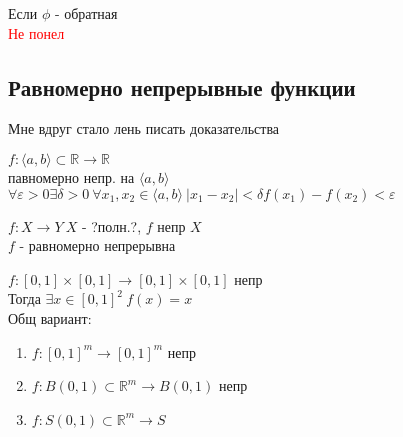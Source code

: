 \documentclass[12pt]{article}
\begin{document}
\begin{note}
  Если $\phi$ - обратная \\
  \textcolor{red}{Не понел} %
\end{note}
\subsection{Равномерно непрерывные функции}
Мне вдруг стало лень писать доказательства %
\begin{definition}
  $f: \langle a, b \rangle \subset \mathbb{R} \rightarrow \mathbb{R}$ \\
  павномерно непр. на $\langle a, b \rangle$ \\
  $\forall \varepsilon > 0 \exists \delta > 0\ \forall x_1, x_2 \in \langle a, b \rangle\ |x_1 - x_2| < \delta f(x_1) - f(x_2) < \varepsilon$
\end{definition}
\begin{theorem}[Кантора]
  $f: X \rightarrow Y\ X$ - ?полн.?, $f$ непр $X$ \\
  $f$ - равномерно непрерывна
\end{theorem}
\begin{theorem}
  $f: [0, 1] \times [0, 1] \rightarrow [0, 1] \times [0, 1]$ непр \\
  Тогда $\exists x \in [0, 1]^2\ f(x) = x$ \\
  Общ вариант:
  \begin{enumerate}
  \item $f: [0, 1]^m \rightarrow [0, 1]^m$ непр
  \item $f: B(0, 1) \subset \mathbb{R}^m \rightarrow B(0,1)$ непр
  \item $f: S(0, 1) \subset \mathbb{R}^m \rightarrow S$
  \end{enumerate}
\end{theorem}
\end{document}
